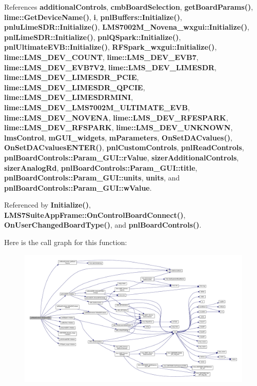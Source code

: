 References {\bf additional\+Controls}, {\bf cmb\+Board\+Selection}, {\bf get\+Board\+Params()}, {\bf lime\+::\+Get\+Device\+Name()}, {\bf i}, {\bf pnl\+Buffers\+::\+Initialize()}, {\bf pnlu\+Lime\+S\+D\+R\+::\+Initialize()}, {\bf L\+M\+S7002\+M\+\_\+\+Novena\+\_\+wxgui\+::\+Initialize()}, {\bf pnl\+Lime\+S\+D\+R\+::\+Initialize()}, {\bf pnl\+Q\+Spark\+::\+Initialize()}, {\bf pnl\+Ultimate\+E\+V\+B\+::\+Initialize()}, {\bf R\+F\+Spark\+\_\+wxgui\+::\+Initialize()}, {\bf lime\+::\+L\+M\+S\+\_\+\+D\+E\+V\+\_\+\+C\+O\+U\+NT}, {\bf lime\+::\+L\+M\+S\+\_\+\+D\+E\+V\+\_\+\+E\+V\+B7}, {\bf lime\+::\+L\+M\+S\+\_\+\+D\+E\+V\+\_\+\+E\+V\+B7\+V2}, {\bf lime\+::\+L\+M\+S\+\_\+\+D\+E\+V\+\_\+\+L\+I\+M\+E\+S\+DR}, {\bf lime\+::\+L\+M\+S\+\_\+\+D\+E\+V\+\_\+\+L\+I\+M\+E\+S\+D\+R\+\_\+\+P\+C\+IE}, {\bf lime\+::\+L\+M\+S\+\_\+\+D\+E\+V\+\_\+\+L\+I\+M\+E\+S\+D\+R\+\_\+\+Q\+P\+C\+IE}, {\bf lime\+::\+L\+M\+S\+\_\+\+D\+E\+V\+\_\+\+L\+I\+M\+E\+S\+D\+R\+M\+I\+NI}, {\bf lime\+::\+L\+M\+S\+\_\+\+D\+E\+V\+\_\+\+L\+M\+S7002\+M\+\_\+\+U\+L\+T\+I\+M\+A\+T\+E\+\_\+\+E\+VB}, {\bf lime\+::\+L\+M\+S\+\_\+\+D\+E\+V\+\_\+\+N\+O\+V\+E\+NA}, {\bf lime\+::\+L\+M\+S\+\_\+\+D\+E\+V\+\_\+\+R\+F\+E\+S\+P\+A\+RK}, {\bf lime\+::\+L\+M\+S\+\_\+\+D\+E\+V\+\_\+\+R\+F\+S\+P\+A\+RK}, {\bf lime\+::\+L\+M\+S\+\_\+\+D\+E\+V\+\_\+\+U\+N\+K\+N\+O\+WN}, {\bf lms\+Control}, {\bf m\+G\+U\+I\+\_\+widgets}, {\bf m\+Parameters}, {\bf On\+Set\+D\+A\+Cvalues()}, {\bf On\+Set\+D\+A\+Cvalues\+E\+N\+T\+E\+R()}, {\bf pnl\+Custom\+Controls}, {\bf pnl\+Read\+Controls}, {\bf pnl\+Board\+Controls\+::\+Param\+\_\+\+G\+U\+I\+::r\+Value}, {\bf sizer\+Additional\+Controls}, {\bf sizer\+Analog\+Rd}, {\bf pnl\+Board\+Controls\+::\+Param\+\_\+\+G\+U\+I\+::title}, {\bf pnl\+Board\+Controls\+::\+Param\+\_\+\+G\+U\+I\+::units}, {\bf units}, and {\bf pnl\+Board\+Controls\+::\+Param\+\_\+\+G\+U\+I\+::w\+Value}.



Referenced by {\bf Initialize()}, {\bf L\+M\+S7\+Suite\+App\+Frame\+::\+On\+Control\+Board\+Connect()}, {\bf On\+User\+Changed\+Board\+Type()}, and {\bf pnl\+Board\+Controls()}.



Here is the call graph for this function\+:
\nopagebreak
\begin{figure}[H]
\begin{center}
\leavevmode
\includegraphics[width=350pt]{df/d93/classpnlBoardControls_a9b3b02be9d2210cbb83e313bde4af24e_cgraph}
\end{center}
\end{figure}




